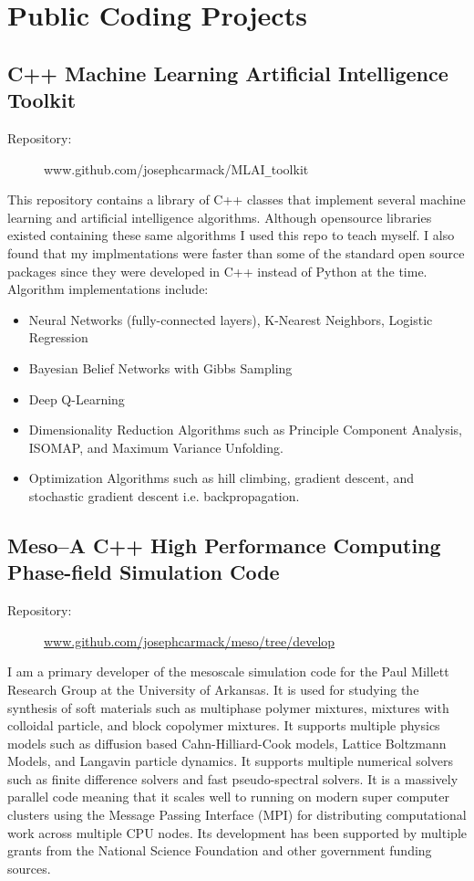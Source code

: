 \documentclass[10pt]{article}
\begin{document}
\section*{Public Coding Projects}

\subsection{C++ Machine Learning Artificial Intelligence Toolkit}
\begin{description}
    \item[Repository:] www.github.com/josephcarmack/MLAI\texttt{\_}toolkit
\end{description}
This repository contains a library of C++ classes that implement several
machine learning and artificial intelligence algorithms. Although opensource libraries existed containing these same algorithms I used this repo to teach myself. I also found that my implmentations were faster than some of the standard open source packages since they were developed in C++ instead of Python at the time. Algorithm implementations include:
 \begin{itemize}
     \itemsep-0.5em
     \item Neural Networks (fully-connected layers), K-Nearest Neighbors, Logistic Regression
     \item Bayesian Belief Networks with Gibbs Sampling
     \item Deep Q-Learning
     \item Dimensionality Reduction Algorithms such as Principle Component
         Analysis, ISOMAP, and Maximum Variance Unfolding.
     \item Optimization Algorithms such as hill climbing, gradient descent,
         and stochastic gradient descent i.e. backpropagation.
 \end{itemize}

\subsection{Meso--A C++ High Performance Computing Phase-field Simulation Code}
\begin{description}
    \item[Repository:] \url{www.github.com/josephcarmack/meso/tree/develop}
\end{description}
I am a primary developer of the mesoscale simulation code for the Paul Millett
Research Group at the University of Arkansas. It is used for studying the
synthesis of soft materials such as multiphase polymer mixtures, mixtures with
colloidal particle, and block copolymer mixtures. It supports multiple physics
models such as diffusion based Cahn-Hilliard-Cook models, Lattice Boltzmann
Models, and Langavin particle dynamics. It supports multiple numerical solvers
such as finite difference solvers and fast pseudo-spectral solvers. It is a
massively parallel code meaning that it scales well to running on modern super
computer clusters using the Message Passing Interface (MPI) for distributing
computational work across multiple CPU nodes. Its development has been
supported by multiple grants from the National Science Foundation and other
government funding sources.
\end{document}

